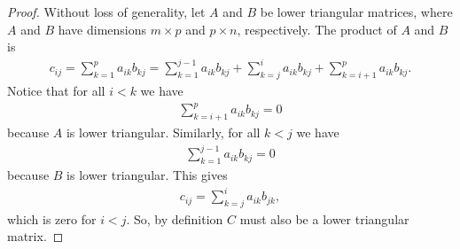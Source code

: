 \documentclass{article}
\begin{document}
\begin{flushleft}
\begin{proof}
			Without loss of generality, let $A$ and $B$ be lower triangular matrices, where $A$ and $B$ have dimensions $m \times p$ and $p \times n$, respectively. The product of $A$ and $B$ is
			\begin{align*}
				c_{ij} = \sum_{k = 1}^p a_{ik} b_{kj} = \sum_{k = 1}^{j - 1} a_{ik} b_{kj} + \sum_{k = j}^i a_{ik} b_{kj} + \sum_{k = i + 1}^p a_{ik} b_{kj}.
			\end{align*}
			Notice that for all $i < k$ we have
			\begin{align*}
				\sum_{k = i + 1}^p a_{ik} b_{kj} = 0
			\end{align*}
			because $A$ is lower triangular. Similarly, for all $k < j$ we have
			\begin{align*}
				\sum_{k = 1}^{j - 1} a_{ik} b_{kj} = 0
			\end{align*}
			because $B$ is lower triangular. This gives 
			\begin{align*}
				c_{ij} = \sum_{k = j}^i a_{ik} b_{jk},
			\end{align*}
			which is zero for $i < j$. So, by definition $C$ must also be a lower triangular matrix.			
		
		\end{proof}
	
	\end{flushleft}
	
\end{document}
